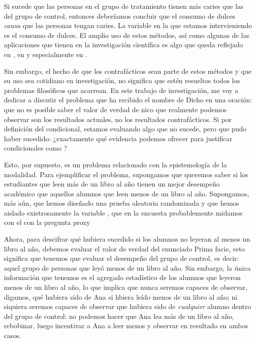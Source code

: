 Si sucede que las personas en el grupo de tratamiento tienen
más caries que las del grupo de control, entonces deberíamos
concluir que el consumo de dulces \emph{causa} que las
personas tengan caries. La variable en la que estamos
intervieniendo es el consumo de dulces. El amplio uso de
estos métodos, así como algunas de las aplicaciones que
tienen en la investigación científica es algo que queda
reflejado en \parencite{Pearl2016}, en \parencite{Pearl2018}
y especialmente en \parencite{llaudet2023}.

Sin embargo, el hecho de que los contrafácticos sean parte
de estos métodos y que su uso sea cotidiano en
investigación, no significa que estén resueltos todos los
problemas filosóficos que acarrean. En este trabajo de
investigación, me voy a dedicar a discutir el problema que
ha recibido el nombre de  \parencite{Holland01121986} Dicho en una
oración: que no es posible saber el valor de verdad de nico
que realmente podemos observar son los resultados actuales,
no los resultados contrafácticos. Si por definición del
condicional, estamos evaluando algo que no sucede, pero que
pudo haber sucedido: ¿exactamente qué evidencia podemos
ofrecer para justificar condicionales como ?

Esto, por supuesto, es un problema relacionado con la
epistemología de la modalidad. Para ejemplificar el
problema, supongamos que queremos saber si los estudiantes
que leen más de un libro al año tienen un mejor desempeño
académico que aquellos alumnos que leen menos de un libro al
año. Supongamos, más aún, que hemos diseñado una prueba
aleatoria randomizada y que hemos aislado existrosamente la
variable , que en la
encuesta probablemente midamos con el con la pregunta proxy

Ahora, para descifrar qué hubiera sucedido si los alumnos no
leyeran al menos un libro al año, debemos evaluar el valor
de verdad del enunciado  Prima facie, esto significa que tenemos que
evaluar el desempeño del grupo de control, es decir: aquel
grupo de personas que leyó menos de un libro al año. Sin
embargo, la única información que tenemos es el agregado
estadístico de los alumnos que leyeron menos de un libro al
año, lo que implica que nunca seremos capaces de observar,
digamos, qué hubiera sido de Ana si hbiera leído menos de un
libro al año; ni siquiera seremos capaces de observar que
hubiera sido de \emph{cualquier} alumno dentro del grupo de
control: no podemos hacer que Ana lea más de un libro al
año, rebobinar, luego incentivar a Ana a leer menos y
observar en resultado en ambos casos.

